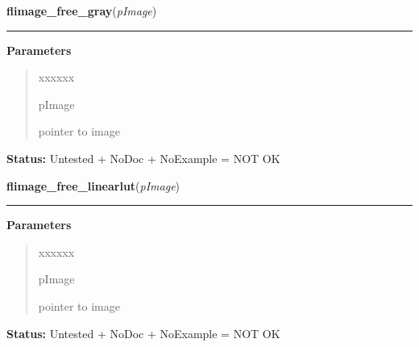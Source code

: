 \hspace{.8\funcindent}\begin{boxedminipage}{\funcwidth}

    \raggedright \textbf{flimage\_free\_gray}(\textit{pImage})

    \vspace{-1.5ex}

    \rule{\textwidth}{0.5\fboxrule}
\setlength{\parskip}{2ex}
\setlength{\parskip}{1ex}
      \textbf{Parameters}
      \vspace{-1ex}

      \begin{quote}
        \begin{Ventry}{xxxxxx}

          \item[pImage]

          pointer to image

        \end{Ventry}

      \end{quote}

\textbf{Status:} Untested + NoDoc + NoExample = NOT OK



    \end{boxedminipage}

    \label{xformslib:library:flimage_free_linearlut}

    \vspace{0.5ex}

\hspace{.8\funcindent}\begin{boxedminipage}{\funcwidth}

    \raggedright \textbf{flimage\_free\_linearlut}(\textit{pImage})

    \vspace{-1.5ex}

    \rule{\textwidth}{0.5\fboxrule}
\setlength{\parskip}{2ex}
\setlength{\parskip}{1ex}
      \textbf{Parameters}
      \vspace{-1ex}

      \begin{quote}
        \begin{Ventry}{xxxxxx}

          \item[pImage]

          pointer to image

        \end{Ventry}

      \end{quote}

\textbf{Status:} Untested + NoDoc + NoExample = NOT OK



    \end{boxedminipage}

